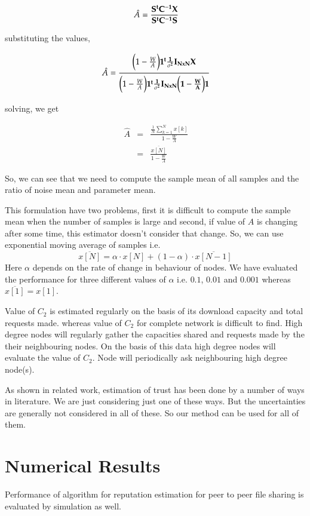 \documentclass{IEEEtran}
\begin{document}
\begin{equation}\
\hat {A}  = \bf{\frac{S^{t}C^{-1}X}{S^{t}C^{-1}S}}
\end{equation}

substituting the values,

\begin{equation}\
\hat {A} = \frac{\biggl(1-\frac{W}{A}\biggl)\bf{1^{t}}\frac{1}{\sigma
^{2}}\bf{I_{NxN}X}}{\biggl(1-\frac{W}{A}\biggl)\bf{1^{t}}\frac{1}{\sigma
^{2}}\bf{I_{NxN}}\biggl(1-\frac{W}{A}\biggl)\bf{1}}
\end{equation}

solving, we get

\begin{eqnarray}\
\hat{A}&=&\frac{\frac{1}{N}\sum\limits^{N}_{k=1}x[k]}{1-\frac{W}{A}}\\
\nonumber &=&\frac{\overline{x[N]}}{1-\frac{W}{A}}
\end{eqnarray}

So, we can see that we need to compute the sample mean of all samples and the
ratio of noise mean and parameter mean.

This formulation have two problems, first it is difficult to compute the sample mean when the number of samples is large and second, if value of $A$ is changing after some time, this estimator doesn't consider that change. So, we can use exponential moving average of samples i.e.
\begin{equation}
\overline {x [N]}=\alpha\cdot x[N] + (1-\alpha)\cdot\overline{ x[N-1]}
\end{equation}
Here $\alpha$  depends on the rate of change in behaviour of nodes. We have evaluated the performance for three different values of $\alpha$ i.e. $0.1$, $0.01$ and $0.001$ whereas $\overline{x[1]}=x[1]$.

Value of $C_{2}$ is estimated regularly on the basis of its download capacity and total requests made. whereas value of $C_{2}$ for complete network is difficult to find. High degree nodes will regularly gather the capacities shared and requests made by the their neighbouring nodes. On the basis of this data high degree nodes will evaluate the value of $C_{2}$. Node will periodically ask neighbouring high degree node(s).

As shown in related work, estimation of trust has been done by a number of ways in literature. We are just considering just one of these ways. But the uncertainties are generally not considered in all of these. So our method can be used for all of them.
\section{Numerical Results}
Performance of algorithm for reputation estimation for peer to peer file sharing is evaluated by simulation as well. 
\end{document}
